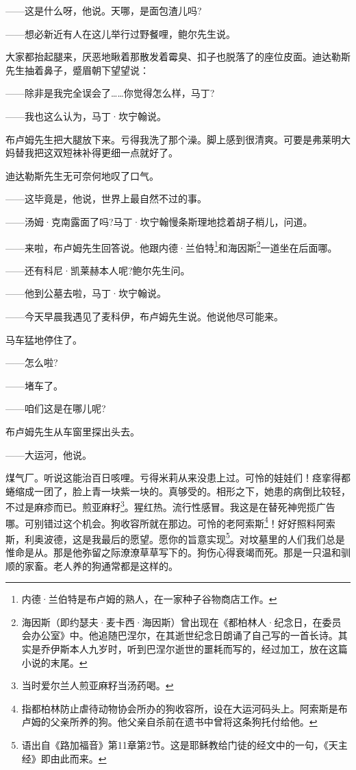 \par ——这是什么呀，他说。天哪，是面包渣儿吗?
\par ——想必新近有人在这儿举行过野餐哩，鲍尔先生说。
\par 大家都抬起腿来，厌恶地瞅着那散发着霉臭、扣子也脱落了的座位皮面。迪达勒斯先生抽着鼻子，蹙眉朝下望望说：
\par ——除非是我完全误会了……你觉得怎么样，马丁?
\par ——我也这么认为，马丁·坎宁翰说。
\par 布卢姆先生把大腿放下来。亏得我洗了那个澡。脚上感到很清爽。可要是弗莱明大妈替我把这双短袜补得更细一点就好了。
\par 迪达勒斯先生无可奈何地叹了口气。
\par ——这毕竟是，他说，世界上最自然不过的事。
\par ——汤姆·克南露面了吗?马丁·坎宁翰慢条斯理地捻着胡子梢儿，问道。
\par ——来啦，布卢姆先生回答说。他跟内德·兰伯特\footnote{内德·兰伯特是布卢姆的熟人，在一家种子谷物商店工作。}和海因斯\footnote{海因斯（即约瑟夫·麦卡西·海因斯）曾出现在《都柏林人·纪念日，在委员会办公室》中。他追随巴涅尔，在其逝世纪念日朗诵了自己写的一首长诗。其实是乔伊斯本人九岁时，听到巴涅尔逝世的噩耗而写的，经过加工，放在这篇小说的末尾。}一道坐在后面哪。
\par ——还有科尼·凯莱赫本人呢?鲍尔先生问。
\par ——他到公墓去啦，马丁·坎宁翰说。
\par ——今天早晨我遇见了麦科伊，布卢姆先生说。他说他尽可能来。
\par 马车猛地停住了。
\par ——怎么啦?
\par ——堵车了。
\par ——咱们这是在哪儿呢?
\par 布卢姆先生从车窗里探出头去。
\par ——大运河，他说。
\par 煤气厂。听说这能治百日咳哩。亏得米莉从来没患上过。可怜的娃娃们！痉挛得都蜷缩成一团了，脸上青一块紫一块的。真够受的。相形之下，她患的病倒比较轻，不过是麻疹而已。煎亚麻籽\footnote{当时爱尔兰人煎亚麻籽当汤药喝。}。猩红热。流行性感冒。我这是在替死神兜揽广告哪。可别错过这个机会。狗收容所就在那边。可怜的老阿索斯\footnote{指都柏林防止虐待动物协会所办的狗收容所，设在大运河码头上。阿索斯是布卢姆的父亲所养的狗。他父亲自杀前在遗书中曾将这条狗托付给他。}！好好照料阿索斯，利奥波德，这是我最后的愿望。愿你的旨意实现\footnote{语出自《路加福音》第11章第2节。这是耶稣教给门徒的经文中的一句，《天主经》即由此而来。}。对坟墓里的人们我们总是惟命是从。那是他弥留之际潦潦草草写下的。狗伤心得衰竭而死。那是一只温和驯顺的家畜。老人养的狗通常都是这样的。
